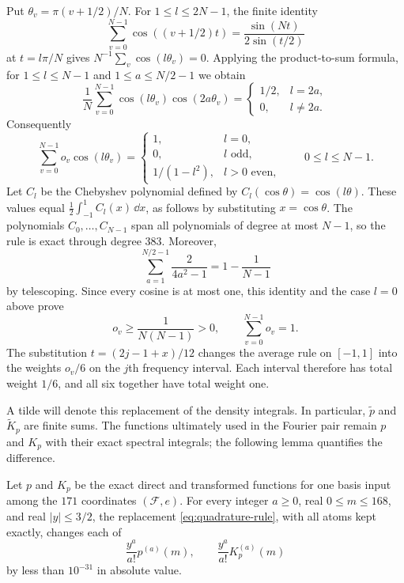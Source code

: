 Put $\theta_v=\pi(v+1/2)/N$.  For $1\le l\le2N-1$, the finite identity
\[
 \sum_{v=0}^{N-1}\cos((v+1/2)t)=\frac{\sin(Nt)}{2\sin(t/2)}
\]
at $t=l\pi/N$ gives $N^{-1}\sum_v\cos(l\theta_v)=0$.  Applying the
product-to-sum formula, for $1\le l\le N-1$ and $1\le a\le N/2-1$ we obtain
\[
 \frac1N\sum_{v=0}^{N-1}\cos(l\theta_v)\cos(2a\theta_v)
 =\begin{cases}1/2,&l=2a,\\0,&l\ne2a.\end{cases}
\]
Consequently
\[
 \sum_{v=0}^{N-1}o_v\cos(l\theta_v)
 =\begin{cases}
 1,&l=0,\\
 0,&l\text{ odd},\\
 1/(1-l^2),&l>0\text{ even},
 \end{cases}
 \qquad 0\le l\le N-1.
\]
Let $C_l$ be the Chebyshev polynomial defined by
$C_l(\cos\theta)=\cos(l\theta)$. These values equal
$\frac12\int_{-1}^1C_l(x)\,\dd x$, as follows by substituting
$x=\cos\theta$. The polynomials $C_0,\ldots,C_{N-1}$ span all polynomials of degree at most
$N-1$, so the rule is exact through degree $383$.  Moreover,
\[
 \sum_{a=1}^{N/2-1}\frac{2}{4a^2-1}=1-\frac1{N-1}
\]
by telescoping.  Since every cosine is at most one, this identity and the
case $l=0$ above prove
\begin{equation}\label{eq:positive-quadrature-weights}
 o_v\ge\frac1{N(N-1)}>0,\qquad \sum_{v=0}^{N-1}o_v=1.
\end{equation}
The substitution $t=(2j-1+x)/12$ changes the average rule on $[-1,1]$
into the weights $o_v/6$ on the $j$th frequency interval.  Each interval
therefore has total weight $1/6$, and all six together have total weight one.

A tilde will denote this replacement of the density integrals.  In particular,
$\widetilde p$ and $\widetilde K_p$ are finite sums.  The functions ultimately
used in the Fourier pair remain $p$ and $K_p$ with their exact spectral
integrals; the following lemma quantifies the difference.

\begin{lemma}\label{lem:quadrature-error}
Let $p$ and $K_p$ be the exact direct and transformed functions for one basis
input among the $171$ coordinates $(\mathcal F,e)$.  For every integer
$a\ge0$, real $0\le m\le168$, and real $|y|\le3/2$, the replacement
\eqref{eq:quadrature-rule}, with all atoms kept exactly, changes each of
\[
 \frac{y^a}{a!}p^{(a)}(m),\qquad
 \frac{y^a}{a!}K_p^{(a)}(m)
\]
by less than $10^{-31}$ in absolute value.
\end{lemma}

